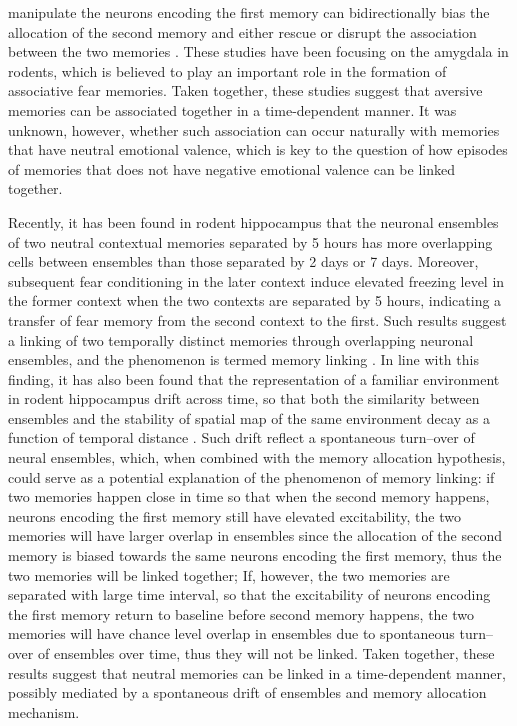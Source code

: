 \documentclass[master.tex]{subfiles}
\begin{document}
manipulate the neurons encoding the first memory can bidirectionally bias the
allocation of the second memory and either rescue or disrupt the association
between the two memories \cite{rashid_competition_2016}. These studies have been
focusing on the amygdala in rodents, which is believed to play an important role
in the formation of associative fear memories. Taken together, these studies
suggest that aversive memories can be associated together in a time-dependent
manner. It was unknown, however, whether such association can occur naturally
with memories that have neutral emotional valence, which is key to the question
of how episodes of memories that does not have negative emotional valence can be
linked together.

Recently, it has been found in rodent hippocampus that the neuronal ensembles of
two neutral contextual memories separated by 5 hours has more overlapping cells
between ensembles than those separated by 2 days or 7 days. Moreover, subsequent
fear conditioning in the later context induce elevated freezing level in the
former context when the two contexts are separated by 5 hours, indicating a
transfer of fear memory from the second context to the first. Such results
suggest a linking of two temporally distinct memories through overlapping
neuronal ensembles, and the phenomenon is termed memory linking
\cite{cai_shared_2016}. In line with this finding, it has also been found that
the representation of a familiar environment in rodent hippocampus drift across
time, so that both the similarity between ensembles and the stability of spatial
map of the same environment decay as a function of temporal distance
\cite{mankin_neuronal_2012, ziv_long-term_2013-1}. Such drift reflect a
spontaneous turn--over of neural ensembles, which, when combined with the memory
allocation hypothesis, could serve as a potential explanation of the phenomenon
of memory linking: if two memories happen close in time so that when the second
memory happens, neurons encoding the first memory still have elevated
excitability, the two memories will have larger overlap in ensembles since the
allocation of the second memory is biased towards the same neurons encoding the
first memory, thus the two memories will be linked together; If, however, the
two memories are separated with large time interval, so that the excitability of
neurons encoding the first memory return to baseline before second memory
happens, the two memories will have chance level overlap in ensembles due to
spontaneous turn--over of ensembles over time, thus they will not be linked.
Taken together, these results suggest that neutral memories can be linked in a
time-dependent manner, possibly mediated by a spontaneous drift of ensembles and
memory allocation mechanism.
\end{document}
